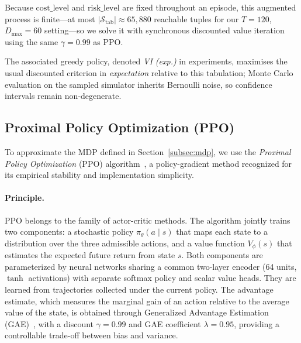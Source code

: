 Because $\mathrm{cost\_level}$ and $\mathrm{risk\_level}$ are fixed throughout an episode, this augmented process is finite---at most $|\mathcal{S}_\text{tab}| \approx 65{,}880$ reachable tuples for our $T{=}120$, $D_{\max}{=}60$ setting---so we solve it with synchronous discounted value iteration using the same $\gamma{=}0{.}99$ as PPO.

The associated greedy policy, denoted \emph{VI (exp.)} in experiments, maximises the usual discounted criterion in \emph{expectation} relative to this tabulation; Monte Carlo evaluation on the sampled simulator inherits Bernoulli noise, so confidence intervals remain non-degenerate.


\subsection{Proximal Policy Optimization (PPO)}
\label{subsec:ppo}

To approximate the MDP defined in Section~\ref{subsec:mdp}, we use the \emph{Proximal Policy Optimization} (PPO) algorithm~\cite{schulman2017ppo}, a policy-gradient method recognized for its empirical stability and implementation simplicity.


\paragraph{Principle.}
PPO belongs to the family of actor-critic methods. The algorithm jointly trains two components: a stochastic policy $\pi_\theta(a \mid s)$ that maps each state to a distribution over the three admissible actions, and a value function $V_\phi(s)$ that estimates the expected future return from state $s$. Both components are parameterized by neural networks sharing a common two-layer encoder (64 units, $\tanh$ activations) with separate softmax policy and scalar value heads. They are learned from trajectories collected under the current policy. The advantage estimate, which measures the marginal gain of an action relative to the average value of the state, is obtained through Generalized Advantage Estimation (GAE)~\cite{schulman2016gae}, with a discount $\gamma = 0.99$ and GAE coefficient $\lambda = 0.95$, providing a controllable trade-off between bias and variance.


